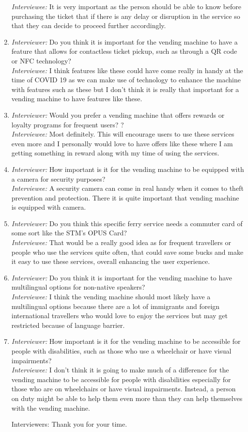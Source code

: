\begin{enumerate}
\emph{Interviewee:} It is very important as the person should be able to know before purchasing the ticket that if there is any delay or disruption in the service so that they can decide to proceed further accordingly.    
    \item \emph{Interviewer:} Do you think it is important for the vending machine to have a feature that allows for contactless ticket pickup, such as through a QR code or NFC technology?\\
\emph{Interviewee:} I think features like these could have come really in handy at the time of COVID 19 as we can make use of technology to enhance the machine with features such as these but I don't think it is really that important for a vending machine to have features like these.
    \item \emph{Interviewer:} Would you prefer a vending machine that offers rewards or loyalty programs for frequent users?
?\\
\emph{Interviewee:} Most definitely. This will encourage users to use these services even more and I personally would love to have offers like these where I am getting something in reward along with my time of using the services.
    \item \emph{Interviewer:} How important is it for the vending machine to be equipped with a camera for security purposes?\\
\emph{Interviewee:} A security camera can come in real handy when it comes to theft prevention and protection. There it is quite important that vending machine is equipped with camera.
    \item \emph{Interviewer:} Do you think this specific ferry service needs a commuter card of some sort like the STM’s OPUS Card?\\
\emph{Interviewee:} That would be a really good idea as for frequent travellers or people who use the services quite often, that could save some bucks and make it easy to use these services, overall enhancing the user experience. 
    \item \emph{Interviewer:} Do you think it is important for the vending machine to have multilingual options for non-native speakers?\\
\emph{Interviewee:} I think the vending machine should most likely have a multilingual options because there are a lot of immigrants and foreign international travellers who would love to enjoy the services but may get restricted because of language barrier.
    \item \emph{Interviewer:} How important is it for the vending machine to be accessible for people with disabilities, such as those who use a wheelchair or have visual impairments?\\
\emph{Interviewee:} I don't think it is going to make much of a difference for the vending machine to be accessible for people with disabilities especially for those who are on wheelchairs or have visual impairments. Instead, a person on duty might be able to help them even more than they can help themselves with the vending machine.

{Interviewers:} Thank you for your time.
\end{enumerate}